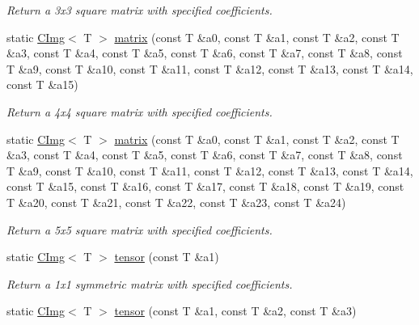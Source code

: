 \begin{DoxyCompactItemize}
\begin{DoxyCompactList}\small\item\em Return a 3x3 square matrix with specified coefficients. \item\end{DoxyCompactList}\item 
\hypertarget{structcimg__library_1_1CImg_a2f9b706c8aa7534e7014afc3ce30a8d9}{
static \hyperlink{structcimg__library_1_1CImg}{CImg}$<$ T $>$ \hyperlink{structcimg__library_1_1CImg_a2f9b706c8aa7534e7014afc3ce30a8d9}{matrix} (const T \&a0, const T \&a1, const T \&a2, const T \&a3, const T \&a4, const T \&a5, const T \&a6, const T \&a7, const T \&a8, const T \&a9, const T \&a10, const T \&a11, const T \&a12, const T \&a13, const T \&a14, const T \&a15)}
\label{structcimg__library_1_1CImg_a2f9b706c8aa7534e7014afc3ce30a8d9}

\begin{DoxyCompactList}\small\item\em Return a 4x4 square matrix with specified coefficients. \item\end{DoxyCompactList}\item 
\hypertarget{structcimg__library_1_1CImg_ab52c8cf4602a06831b2bbe607cc619cc}{
static \hyperlink{structcimg__library_1_1CImg}{CImg}$<$ T $>$ \hyperlink{structcimg__library_1_1CImg_ab52c8cf4602a06831b2bbe607cc619cc}{matrix} (const T \&a0, const T \&a1, const T \&a2, const T \&a3, const T \&a4, const T \&a5, const T \&a6, const T \&a7, const T \&a8, const T \&a9, const T \&a10, const T \&a11, const T \&a12, const T \&a13, const T \&a14, const T \&a15, const T \&a16, const T \&a17, const T \&a18, const T \&a19, const T \&a20, const T \&a21, const T \&a22, const T \&a23, const T \&a24)}
\label{structcimg__library_1_1CImg_ab52c8cf4602a06831b2bbe607cc619cc}

\begin{DoxyCompactList}\small\item\em Return a 5x5 square matrix with specified coefficients. \item\end{DoxyCompactList}\item 
\hypertarget{structcimg__library_1_1CImg_ad51e031c3ff9afc1c1f5587e770ff382}{
static \hyperlink{structcimg__library_1_1CImg}{CImg}$<$ T $>$ \hyperlink{structcimg__library_1_1CImg_ad51e031c3ff9afc1c1f5587e770ff382}{tensor} (const T \&a1)}
\label{structcimg__library_1_1CImg_ad51e031c3ff9afc1c1f5587e770ff382}

\begin{DoxyCompactList}\small\item\em Return a 1x1 symmetric matrix with specified coefficients. \item\end{DoxyCompactList}\item 
\hypertarget{structcimg__library_1_1CImg_a5ec2064aa2a36440d892d0ffe814975f}{
static \hyperlink{structcimg__library_1_1CImg}{CImg}$<$ T $>$ \hyperlink{structcimg__library_1_1CImg_a5ec2064aa2a36440d892d0ffe814975f}{tensor} (const T \&a1, const T \&a2, const T \&a3)}
\label{structcimg__library_1_1CImg_a5ec2064aa2a36440d892d0ffe814975f}


\end{DoxyCompactItemize}

